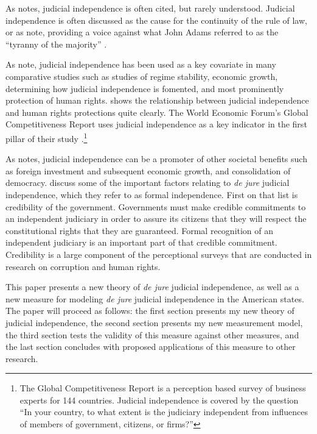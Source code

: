 \documentclass[12pt]{article}
\begin{document}
As \citet{Tiede2006} notes, judicial independence is often cited, but rarely understood.  Judicial independence is often discussed as the cause for the continuity of the rule of law, or as \citet{Ferejohn2003} note, providing a voice against what John Adams referred to as the ``tyranny of the majority'' \citep{Adams1794}. 

As \citet[1]{Linzer2014} note, judicial independence has been used as a key covariate in many comparative studies such as studies of regime stability, economic growth, determining how judicial independence is fomented, and most prominently protection of human rights.  \citet{Keith2002b} shows the relationship between judicial independence and human rights protections quite clearly.  The World Economic Forum's Global Competitiveness Report uses judicial independence as a key indicator in the first pillar of their study \citep{WEFGLR2014}.\footnote{The Global Competitiveness Report is a perception based survey of business experts for 144 countries.  Judicial independence is covered by the question ``In your country, to what extent is the judiciary independent from influences of members of government, citizens, or firms?''}   

As \citet[9]{Rios2006} notes, judicial independence can be a promoter of other societal benefits such as foreign investment and subsequent economic growth, and consolidation of democracy.   \citet{Hayo2007} discuss some of the important factors relating to \textit{de jure} judicial independence, which they refer to as formal independence.  First on that list is credibility of the government.  Governments must make credible commitments to an independent judiciary in order to assure its citizens that they will respect the constitutional rights that they are guaranteed.  Formal recognition of an independent judiciary is an important part of that credible commitment.   Credibility is a large component of the perceptional surveys that are conducted in research on corruption and human rights.

This paper presents a new theory of \textit{de jure} judicial independence, as well as a new measure for modeling \textit{de jure} judicial independence in the American states.  The paper will proceed as follows: the first section presents my new theory of judicial independence, the second section presents my new measurement model, the third section tests the validity of this measure against other measures, and the last section concludes with proposed applications of this measure to other research.
\end{document}
